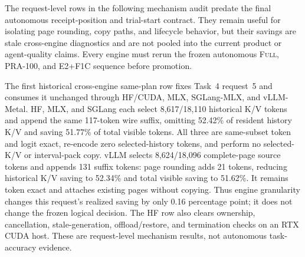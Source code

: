 \documentclass[11pt]{article}
\begin{document}
The request-level rows in the following mechanism audit predate the final
autonomous receipt-position and trial-start contract.  They remain useful for
isolating page rounding, copy paths, and lifecycle behavior, but their savings
are stale cross-engine diagnostics and are not pooled into the current product
or agent-quality claims.  Every engine must rerun the frozen autonomous
\textsc{Full}, PRA-100, and E2+F1C sequence before promotion.

The first historical cross-engine same-plan row fixes Task~4 request~5 and consumes it
unchanged through HF/CUDA, MLX, SGLang-MLX, and vLLM-Metal.  HF, MLX, and
SGLang each select 8,617/18,110 historical K/V tokens and append the same
117-token wire suffix, omitting 52.42\% of resident history K/V and saving
51.77\% of total visible tokens.  All three are same-subset token and logit
exact, re-encode zero selected-history tokens, and perform no selected-K/V or
interval-pack copy.  vLLM selects 8,624/18,096 complete-page source tokens and
appends 131 suffix tokens: page rounding adds 21 tokens, reducing historical
K/V saving to 52.34\% and total visible saving to 51.62\%.  It remains token
exact and attaches existing pages without copying.  Thus engine granularity
changes this request's realized saving by only 0.16 percentage point; it does
not change the frozen logical decision.  The HF row also clears ownership,
cancellation, stale-generation, offload/restore, and termination checks on an
RTX CUDA host.  These are request-level mechanism results, not autonomous
task-accuracy evidence.
\end{document}

